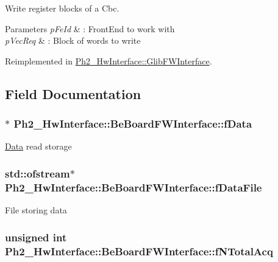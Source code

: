 Write register blocks of a Cbc. 


\begin{DoxyParams}{Parameters}
{\em p\-Fe\-Id} & \-: Front\-End to work with \\
\hline
{\em p\-Vec\-Req} & \-: Block of words to write \\
\hline
\end{DoxyParams}


Reimplemented in \hyperlink{class_ph2___hw_interface_1_1_glib_f_w_interface_a2bc165eebeab754425dcbffb21aa2717}{Ph2\-\_\-\-Hw\-Interface\-::\-Glib\-F\-W\-Interface}.



\subsection{Field Documentation}
\hypertarget{class_ph2___hw_interface_1_1_be_board_f_w_interface_a9b315d4b61df34d093ed35cfef755a0f}{
\subsubsection[{f\-Data}]{$\ast$ Ph2\-\_\-\-Hw\-Interface\-::\-Be\-Board\-F\-W\-Interface\-::f\-Data}}\label{class_ph2___hw_interface_1_1_be_board_f_w_interface_a9b315d4b61df34d093ed35cfef755a0f}
\hyperlink{class_ph2___hw_interface_1_1_data}{Data} read storage \hypertarget{class_ph2___hw_interface_1_1_be_board_f_w_interface_afa2f1748f8a2d527961766449cd91386}{
\subsubsection[{f\-Data\-File}]{\setlength{\rightskip}{0pt plus 5cm}std\-::ofstream$\ast$ Ph2\-\_\-\-Hw\-Interface\-::\-Be\-Board\-F\-W\-Interface\-::f\-Data\-File}}\label{class_ph2___hw_interface_1_1_be_board_f_w_interface_afa2f1748f8a2d527961766449cd91386}
File storing data \hypertarget{class_ph2___hw_interface_1_1_be_board_f_w_interface_a9cc80365ec331732245553a8bc0024ab}{
\subsubsection[{f\-N\-Total\-Acq}]{\setlength{\rightskip}{0pt plus 5cm}unsigned int Ph2\-\_\-\-Hw\-Interface\-::\-Be\-Board\-F\-W\-Interface\-::f\-N\-Total\-Acq}}\label{class_ph2___hw_interface_1_1_be_board_f_w_interface_a9cc80365ec331732245553a8bc0024ab}


